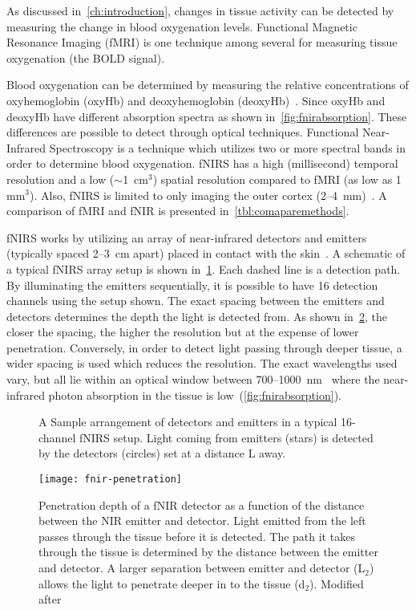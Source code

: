 As discussed in~\cref{ch:introduction}, changes in tissue activity can be detected by measuring the change in blood oxygenation levels.  Functional Magnetic Resonance Imaging (fMRI) is one technique among several for measuring tissue oxygenation (the BOLD signal).

Blood oxygenation can be determined by measuring the relative concentrations of oxyhemoglobin (oxyHb) and deoxyhemoglobin (deoxyHb)~\citep{ogawa1990,kwong1992,fox1986}.  Since oxyHb and deoxyHb have different absorption spectra as shown in~\cref{fig:fnirabsorption}. These differences are possible to detect  through optical techniques.  Functional Near-Infrared Spectroscopy is a technique which utilizes two or more spectral bands in order to determine blood oxygenation.  fNIRS has a high (millisecond) temporal resolution and a low ($\sim$1~cm$^3$) spatial resolution compared to fMRI (as low as 1 mm$^3$). Also, fNIRS is limited to only imaging the outer cortex (2--4~mm)~\citep{bunce2006}. A comparison of fMRI and fNIR is presented in~\cref{tbl:comaparemethods}.

fNIRS works by utilizing an array of near-infrared detectors and emitters (typically spaced 2--3~cm apart) placed in contact with the skin~\citep{villringer1997,izzetoglu2004}.  A schematic of a typical fNIRS array setup is shown in~\cref{fig:fnir-arragement}. Each dashed line is a detection path. By illuminating the emitters sequentially, it is possible to have 16 detection channels using the setup shown.  The exact spacing between the emitters and detectors determines the depth the light is detected from.  As shown in~\cref{fig:fnirpenetration}, the closer the spacing, the higher the resolution but at the expense of lower penetration.  Conversely, in order to detect light passing through deeper tissue, a wider spacing is used which reduces the resolution.  The exact wavelengths used vary, but all lie within an optical window between 700--1000~nm~\citep{villringer1997} where the near-infrared photon absorption in the tissue is low~(\cref{fig:fnirabsorption}).

\begin{figure}[tb]
  \centering
  
  \caption[Sample arrangement of detectors and emitters in a typical fNIRS setup]{\label{fig:fnir-arragement}A Sample arrangement of detectors and emitters in a typical 16-channel fNIRS setup. Light coming from emitters (stars) is detected by the detectors (circles) set at a distance L away.}
\end{figure}
\begin{figure}[tb]
  \centering
  \texttt{[image: fnir-penetration]}
  \caption[Penetration by fNIR]{\label{fig:fnirpenetration}Penetration depth of a fNIR detector as a function of the distance between the NIR emitter and detector.  Light emitted from the left passes through the tissue before it is detected.  The path it takes through the tissue is determined by the distance between the emitter and detector.  A larger separation between emitter and detector (L$_2$) allows the light to penetrate deeper in to the tissue (d$_2$).  Modified after~\citep{head2010}}
\end{figure}


